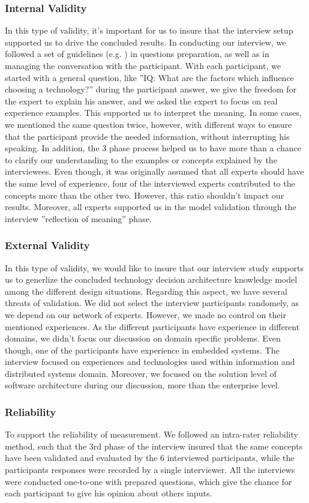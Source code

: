 \documentclass[conference]{IEEEtran}
\begin{document}
\subsubsection{Internal Validity}
In this type of validity, it's important for us to insure that the interview
setup supported us to drive the concluded results. In conducting our interview,
we followed a set of guidelines (e.g. \cite{InterviewGuide}) in questions
preparation, as well as in managing the conversation with the participant. With
each participant, we started with a general question, like ''IQ: What are the
factors which influence choosing a technology?'' during the participant answer,
we give the freedom for the expert to explain his answer, and we asked the
expert to focus on real experience examples. This supported us to interpret the
meaning. In some cases, we mentioned the same question twice, however, with
different ways to ensure that the participant provide the needed information,
without interrupting his speaking. In addition, the 3 phase process helped us to
have more than a chance to clarify our understanding to the examples or concepts
explained by the interviewees. Even though, it was originally assumed that all
experts should have the same level of experience, four of the interviewed
experts contributed to the concepts more than the other two. However, this ratio
shouldn't impact our results. Moreover, all experts supported us in the model
validation through the interview ''reflection of meaning'' phase.
\subsubsection{External Validity}
In this type of validity, we would like to insure that our interview study
supports us to generlize the concluded technology decision architecture
knowledge model among the different design situations. Regarding this aspect, we
have several threats of validation. We did not select the interview participants
randomely, as we depend on our network of experts. However, we made no control
on their mentioned experiences. As the different participants have experience in
different domains, we didn't focus our discussion on domain specific problems.
Even though, one of the participants have experience in embedded systems. The
interview focused on experiences and technologies used within information and
distributed systems domain. Moreover, we focused on the solution level of
software architecture during our discussion, more than the enterprise level.
\subsubsection{Reliability}
To support the reliability of measurement. We followed an intra-rater
reliability method, such that the 3rd phase of the interview insured that the
same concepts have been validated and evaluated by the 6 interviewed
participants, while the participants responses were recorded by a single
interviewer. All the interviews were conducted one-to-one with prepared
questions, which give the chance for each participant to give his opinion about
others inputs.
\end{document}
